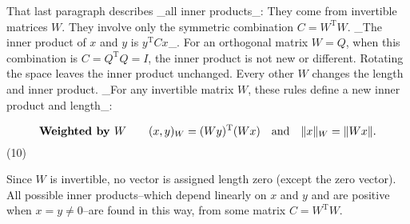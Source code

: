 That last paragraph describes _all inner products_: They come from invertible matrices \(W\). They involve only the symmetric combination \(C=W^{\mathrm{T}}W\). _The inner product of \(x\) and \(y\) is \(y^{\mathrm{T}}Cx\)_. For an orthogonal matrix \(W=Q\), when this combination is \(C=Q^{\mathrm{T}}Q=I\), the inner product is not new or different. Rotating the space leaves the inner product unchanged. Every other \(W\) changes the length and inner product. _For any invertible matrix \(W\), these rules define a new inner product and length_:

\[\mbox{\bf Weighted by }W\qquad(x,y)_{W}=(Wy)^{\mathrm{T}}(Wx)\quad\mbox{and} \quad\|x\|_{W}=\|Wx\|.\] (10)

Since \(W\) is invertible, no vector is assigned length zero (except the zero vector). All possible inner products--which depend linearly on \(x\) and \(y\) and are positive when \(x=y\neq 0\)--are found in this way, from some matrix \(C=W^{\mathrm{T}}W\).

 